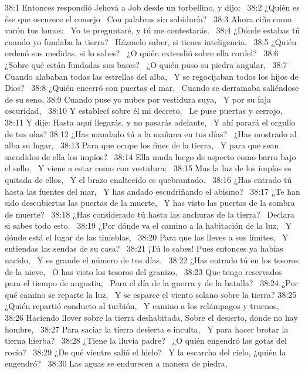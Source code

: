 38:1 Entonces respondió Jehová a Job desde un torbellino, y dijo:  
38:2 ¿Quién es ése que oscurece el consejo  
Con palabras sin sabiduría?  
38:3 Ahora ciñe como varón tus lomos;  
Yo te preguntaré, y tú me contestarás.  
38:4 ¿Dónde estabas tú cuando yo fundaba la tierra?  
Házmelo saber, si tienes inteligencia.  
38:5 ¿Quién ordenó sus medidas, si lo sabes?  
¿O quién extendió sobre ella cordel?  
38:6 ¿Sobre qué están fundadas sus bases?  
¿O quién puso su piedra angular,  
38:7 Cuando alababan todas las estrellas del alba,  
Y se regocijaban todos los hijos de Dios?  
38:8 ¿Quién encerró con puertas el mar,  
Cuando se derramaba saliéndose de su seno, 
38:9 Cuando puse yo nubes por vestidura suya,  
Y por su faja oscuridad,  
38:10 Y establecí sobre él mi decreto,  
Le puse puertas y cerrojo,  
38:11 Y dije: Hasta aquí llegarás, y no pasarás adelante,  
Y ahí parará el orgullo de tus olas? 
38:12 ¿Has mandado tú a la mañana en tus días?  
¿Has mostrado al alba su lugar,  
38:13 Para que ocupe los fines de la tierra,  
Y para que sean sacudidos de ella los impíos?  
38:14 Ella muda luego de aspecto como barro bajo el sello,  
Y viene a estar como con vestidura;  
38:15 Mas la luz de los impíos es quitada de ellos,  
Y el brazo enaltecido es quebrantado.  
38:16 ¿Has entrado tú hasta las fuentes del mar,  
Y has andado escudriñando el abismo?  
38:17 ¿Te han sido descubiertas las puertas de la muerte,  
Y has visto las puertas de la sombra de muerte?  
38:18 ¿Has considerado tú hasta las anchuras de la tierra?  
Declara si sabes todo esto.  
38:19 ¿Por dónde va el camino a la habitación de la luz,  
Y dónde está el lugar de las tinieblas,  
38:20 Para que las lleves a sus límites,  
Y entiendas las sendas de su casa?  
38:21 ¡Tú lo sabes! Pues entonces ya habías nacido,  
Y es grande el número de tus días.  
38:22 ¿Has entrado tú en los tesoros de la nieve,  
O has visto los tesoros del granizo,  
38:23 Que tengo reservados para el tiempo de angustia,  
Para el día de la guerra y de la batalla?  
38:24 ¿Por qué camino se reparte la luz,  
Y se esparce el viento solano sobre la tierra? 
38:25 ¿Quién repartió conducto al turbión,  
Y camino a los relámpagos y truenos,  
38:26 Haciendo llover sobre la tierra deshabitada, 
Sobre el desierto, donde no hay hombre,  
38:27 Para saciar la tierra desierta e inculta,  
Y para hacer brotar la tierna hierba?  
38:28 ¿Tiene la lluvia padre?  
¿O quién engendró las gotas del rocío?  
38:29 ¿De qué vientre salió el hielo?  
Y la escarcha del cielo, ¿quién la engendró?  
38:30 Las aguas se endurecen a manera de piedra,  
